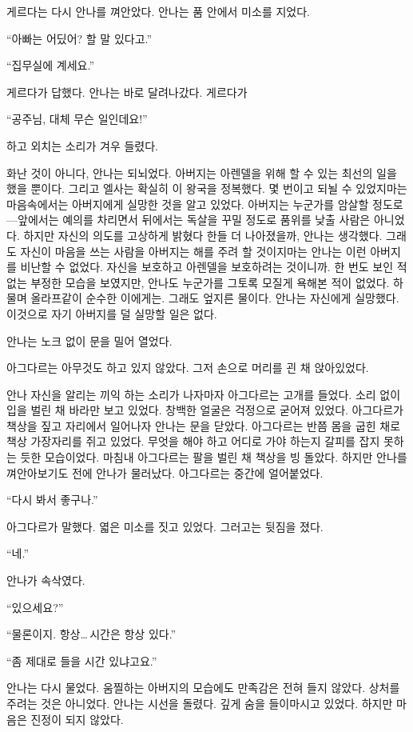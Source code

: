 게르다는 다시 안나를 껴안았다. 안나는 품 안에서 미소를 지었다.

``아빠는 어딨어? 할 말 있다고.''

``집무실에 계세요.''

게르다가 답했다. 안나는 바로 달려나갔다. 게르다가

``공주님, 대체 무슨 일인데요!''

하고 외치는 소리가 겨우 들렸다.

화난 것이 아니다, 안나는 되뇌었다. 아버지는 아렌델을 위해 할 수 있는 최선의 일을 했을 뿐이다. 그리고 엘사는 확실히 이 왕국을 정복했다. 몇 번이고 되뇔 수 있었지마는 마음속에서는 아버지에게 실망한 것을 알고 있었다. 아버지는 누군가를 암살할 정도로—앞에서는 예의를 차리면서 뒤에서는 독살을 꾸밀 정도로 품위를 낮출 사람은 아니었다. 하지만 자신의 의도를 고상하게 밝혔다 한들 더 나아졌을까, 안나는 생각했다. 그래도 자신이 마음을 쓰는 사람을 아버지는 해를 주려 할 것이지마는 안나는 이런 아버지를 비난할 수 없었다. 자신을 보호하고 아렌델을 보호하려는 것이니까. 한 번도 보인 적 없는 부정한 모습을 보였지만, 안나도 누군가를 그토록 모질게 욕해본 적이 없었다. 하물며 올라프같이 순수한 이에게는. 그래도 엎지른 물이다. 안나는 자신에게 실망했다. 이것으로 자기 아버지를 덜 실망할 일은 없다.

안나는 노크 없이 문을 밀어 열었다.

아그다르는 아무것도 하고 있지 않았다. 그저 손으로 머리를 괸 채 앉아있었다.

안나 자신을 알리는 끼익 하는 소리가 나자마자 아그다르는 고개를 들었다. 소리 없이 입을 벌린 채 바라만 보고 있었다. 창백한 얼굴은 걱정으로 굳어져 있었다. 아그다르가 책상을 짚고 자리에서 일어나자 안나는 문을 닫았다. 아그다르는 반쯤 몸을 굽힌 채로 책상 가장자리를 쥐고 있었다. 무엇을 해야 하고 어디로 가야 하는지 갈피를 잡지 못하는 듯한 모습이었다. 마침내 아그다르는 팔을 벌린 채 책상을 빙 돌았다. 하지만 안나를 껴안아보기도 전에 안나가 물러났다. 아그다르는 중간에 얼어붙었다.

``다시 봐서 좋구나.''

아그다르가 말했다. 엷은 미소를 짓고 있었다. 그러고는 뒷짐을 졌다.

``네.''

안나가 속삭였다.

`` 있으세요?''

``물론이지. 항상\ldots\,시간은 항상 있다.''

``좀 제대로 들을 시간 있냐고요.''

안나는 다시 물었다. 움찔하는 아버지의 모습에도 만족감은 전혀 들지 않았다. 상처를 주려는 것은 아니었다. 안나는 시선을 돌렸다. 깊게 숨을 들이마시고 있었다. 하지만 마음은 진정이 되지 않았다.

